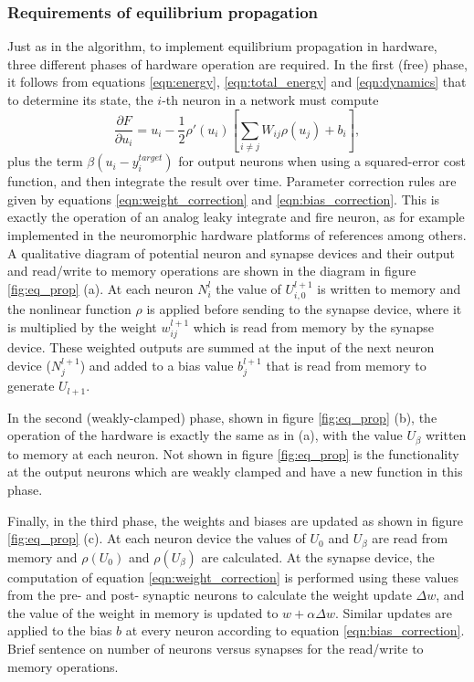 \documentclass[utf8]{frontiersSCNS}
\begin{document}
\subsubsection{Requirements of equilibrium propagation}

Just as in the algorithm, to implement equilibrium propagation in hardware, three
different phases of hardware operation are required. In the first (free) phase, it follows
from equations \ref{eqn:energy}, \ref{eqn:total_energy} and \ref{eqn:dynamics} that to determine 
its state, the $i$-th neuron in a network must compute $$\frac{\partial F}{\partial 
u_i}=u_i-\frac{1}{2}\rho'(u_i)[\sum_{i\neq j}W_{ij}\rho(u_j)+b_i],$$ plus the term 
$\beta(u_i-y_i^{target})$ for output neurons when using a squared-error cost function, and then 
integrate the result over time. Parameter correction rules are given by equations 
\ref{eqn:weight_correction} and \ref{eqn:bias_correction}. This is exactly the 
operation of an analog leaky integrate and fire neuron, as for example implemented in the 
neuromorphic hardware platforms of references \citep{indiveri2011, schemmel2010} among others. A 
qualitative diagram of potential neuron and synapse devices and their output and read/write to 
memory operations are shown in the diagram in figure \ref{fig:eq_prop} (a). At each neuron $N^l_{i}$ 
the value of $U^{l+1}_{i,0}$ is written to memory and the nonlinear function $\rho$ is applied 
before sending to the synapse device, where it is multiplied by the weight $w^{l+1}_{ij}$ which is 
read from memory by the synapse device. These weighted outputs are summed at the input of the next 
neuron device ($N^{l+1}_j$) and added to a bias value $b^{l+1}_j$ that is read from memory to 
generate $U_{l+1}$.

In the second (weakly-clamped) phase, shown in figure \ref{fig:eq_prop} (b), the operation of the 
hardware is exactly the same as in (a), with the value $U_{\beta}$ written to memory at each 
neuron. Not shown in figure \ref{fig:eq_prop} is the functionality at the output neurons which are 
weakly clamped and have a new function in this phase.

Finally, in the third phase, the weights and biases are updated as shown in figure \ref{fig:eq_prop}
(c). At each neuron device the values of $U_0$ and $U_\beta$ are read from memory and $\rho({U_0})$
and $\rho({U_\beta})$ are calculated. At the synapse device, the computation of equation \ref{eqn:weight_correction} is performed 
using these values from the pre- and post- synaptic neurons to calculate the weight update $\Delta 
w$, and the value of the weight in memory is updated to $w+\alpha\Delta w$.  Similar updates are applied 
to the bias $b$ at every neuron according to equation \ref{eqn:bias_correction}. {\color{blue} Brief sentence on number of 
neurons versus synapses for the read/write to memory operations}.
\end{document}
